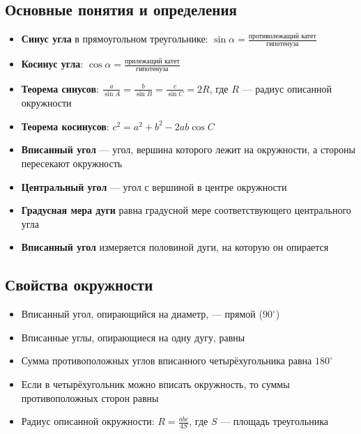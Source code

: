 \documentclass[a4paper,12pt]{article}
\begin{document}
\subsection*{Основные понятия и определения}
\begin{itemize}[label=\textcolor{accent}{\textbullet}, leftmargin=*]
    \item \textbf{Синус угла} в прямоугольном треугольнике: $\sin\alpha = \frac{\text{противолежащий катет}}{\text{гипотенуза}}$
    \item \textbf{Косинус угла}: $\cos\alpha = \frac{\text{прилежащий катет}}{\text{гипотенуза}}$
    \item \textbf{Теорема синусов}: $\frac{a}{\sin A} = \frac{b}{\sin B} = \frac{c}{\sin C} = 2R$, где $R$ — радиус описанной окружности
    \item \textbf{Теорема косинусов}: $c^2 = a^2 + b^2 - 2ab\cos C$
    \item \textbf{Вписанный угол} — угол, вершина которого лежит на окружности, а стороны пересекают окружность
    \item \textbf{Центральный угол} — угол с вершиной в центре окружности
    \item \textbf{Градусная мера дуги} равна градусной мере соответствующего центрального угла
    \item \textbf{Вписанный угол} измеряется половиной дуги, на которую он опирается
\end{itemize}

\subsection*{Свойства окружности}
\begin{itemize}[label=\textcolor{accent}{\textbullet}, leftmargin=*]
    \item Вписанный угол, опирающийся на диаметр, — прямой ($90^\circ$)
    \item Вписанные углы, опирающиеся на одну дугу, равны
    \item Сумма противоположных углов вписанного четырёхугольника равна $180^\circ$
    \item Если в четырёхугольник можно вписать окружность, то суммы противоположных сторон равны
    \item Радиус описанной окружности: $R = \frac{abc}{4S}$, где $S$ — площадь треугольника
\end{itemize}
\end{document}
